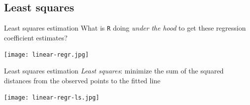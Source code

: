\documentclass[10pt,t]{beamer}
\begin{document}
\subsection{Least squares}

\begin{frame}{Least squares estimation}
What is \texttt{R} doing \textit{under the hood} to get these regression coefficient estimates? \pause

\vspace{0.3cm}

\centering \texttt{[image: linear-regr.jpg]}
\end{frame}

\begin{frame}{Least squares estimation}
\textit{Least squares}: minimize the sum of the squared distances from the observed points to the fitted line

\vspace{0.3cm}

\centering \texttt{[image: linear-regr-ls.jpg]}

\end{frame}
\end{document}
